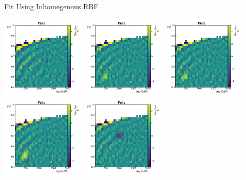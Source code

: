 \documentclass[10pt]{beamer}
\begin{document}
\begin{frame}{Fit Using Inhomegenous RBF}
  \begin{center}
    \includegraphics[width=0.3\textwidth]{figures/2dpullplots/rbf/E_1200_0p5_100_0p05.pdf} 
    \includegraphics[width=0.3\textwidth]{figures/2dpullplots/rbf/E_1500_0p5_100_0p05.pdf} 
    \includegraphics[width=0.3\textwidth]{figures/2dpullplots/rbf/E_1500_0p5_150_0p05.pdf} 
    \includegraphics[width=0.3\textwidth]{figures/2dpullplots/rbf/E_1500_0p5_150_0p07.pdf} 
    \includegraphics[width=0.3\textwidth]{figures/2dpullplots/rbf/E_2000_0p7_150_0p05.pdf} 

\end{center}
\end{frame}
\end{document}
